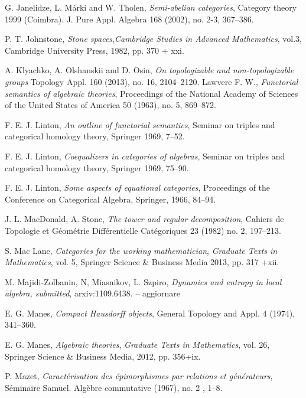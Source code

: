 \documentclass[12pt]{article}
\theoremstyle{definition}
\numberwithin{equation}{section}
\begin{document}
\begin{thebibliography}{999}
{ G. Janelidze, L. Márki and W. Tholen, {\em Semi-abelian categories}, 
Category theory 1999 (Coimbra). J. Pure Appl. Algebra 168 (2002), no. 2-3, 367--386. 

 P. T. Johnstone, {\em Stone spaces},{\em Cambridge Studies in Advanced Mathematics}, vol.3, Cambridge University Press, 1982, pp. 370 + xxi.

 A. Klyachko, A. Olshanskii and D. Osin, {\em  On topologizable and non-topologizable groups} Topology Appl. 160 (2013), no. 16, 2104--2120. 
 Lawvere F. W., {\em Functorial semantics of algebraic theories}, Proceedings of the National Academy of Sciences of the United States of America 50 (1963), no. 5, 869--872.


 F. E. J. Linton, {\em An outline of functorial semantics},
Seminar on triples and categorical homology theory, Springer 1969, 7--52.

 F. E. J. Linton, {\em Coequalizers in categories of algebras},
Seminar on triples and categorical homology theory, Springer 1969, 75--90.

 F. E. J. Linton, {\em Some aspects of equational categories},
{Proceedings of the Conference on Categorical Algebra}, Springer, 1966, 84--94.

 J. L. MacDonald, A. Stone, {\em The tower and regular decomposition}, Cahiers de Topologie et G\'eom\'etrie Diff\'erentielle Cat\'egoriques 23 (1982) no. 2, 197--213.


 {S. Mac Lane}, {\it Categories for the working mathematician}, {\sl Graduate Texts in Mathematics}, vol. 5, Springer Science \& Business Media 2013, pp. 317 +xii.

 M. Majidi-Zolbanin, N, Miasnikov, L. Szpiro, \emph{Dynamics and entropy in local algebra, submitted}, arxiv:1109.6438. -- aggiornare 

 E. G. Manes, {\em Compact Hausdorff objects},   General Topology and Appl. 4 (1974), 341--360. 

 E. G. Manes, {\em Algebraic theories}, {\sl Graduate Texts in Mathematics}, vol. 26, Springer Science \& Business Media, 2012, pp. 356+ix.

 P. Mazet, {\em Caract{\'e}risation des {\'e}pimorphismes par relations et g{\'e}n{\'e}rateurs}, {S{\'e}minaire Samuel. Alg{\`e}bre commutative} (1967), no. 2 , {1--8}.


}
\end{thebibliography}
\end{document}
